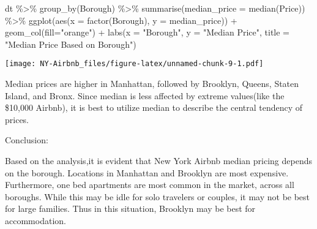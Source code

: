 \documentclass[
]{article}
\newenvironment{Shaded}{\begin{snugshade}}{\end{snugshade}}
\newcommand{\AttributeTok}[1]{\textcolor[rgb]{0.77,0.63,0.00}{#1}}
\newcommand{\FunctionTok}[1]{\textcolor[rgb]{0.00,0.00,0.00}{#1}}
\newcommand{\NormalTok}[1]{#1}
\newcommand{\SpecialCharTok}[1]{\textcolor[rgb]{0.00,0.00,0.00}{#1}}
\newcommand{\StringTok}[1]{\textcolor[rgb]{0.31,0.60,0.02}{#1}}
\begin{document}
\begin{Shaded}
\begin{Highlighting}[]
\NormalTok{dt }\SpecialCharTok{\%\textgreater{}\%}
  \FunctionTok{group\_by}\NormalTok{(Borough) }\SpecialCharTok{\%\textgreater{}\%}
  \FunctionTok{summarise}\NormalTok{(}\AttributeTok{median\_price =} \FunctionTok{median}\NormalTok{(Price)) }\SpecialCharTok{\%\textgreater{}\%}
  \FunctionTok{ggplot}\NormalTok{(}\FunctionTok{aes}\NormalTok{(}\AttributeTok{x =} \FunctionTok{factor}\NormalTok{(Borough), }\AttributeTok{y =}\NormalTok{ median\_price)) }\SpecialCharTok{+}
  \FunctionTok{geom\_col}\NormalTok{(}\AttributeTok{fill=}\StringTok{"orange"}\NormalTok{) }\SpecialCharTok{+}
  \FunctionTok{labs}\NormalTok{(}\AttributeTok{x =} \StringTok{"Borough"}\NormalTok{, }\AttributeTok{y =} \StringTok{"Median Price"}\NormalTok{, }\AttributeTok{title =} \StringTok{"Median Price Based on Borough"}\NormalTok{)}
\end{Highlighting}
\end{Shaded}

\texttt{[image: NY-Airbnb\_files/figure-latex/unnamed-chunk-9-1.pdf]}

Median prices are higher in Manhattan, followed by Brooklyn, Queens,
Staten Island, and Bronx. Since median is less affected by extreme
values(like the \$10,000 Airbnb), it is best to utilize median to
describe the central tendency of prices.

Conclusion:

Based on the analysis,it is evident that New York Airbnb median pricing
depends on the borough. Locations in Manhattan and Brooklyn are most
expensive. Furthermore, one bed apartments are most common in the
market, across all boroughs. While this may be idle for solo travelers
or couples, it may not be best for large families. Thus in this
situation, Brooklyn may be best for accommodation.
\end{document}
